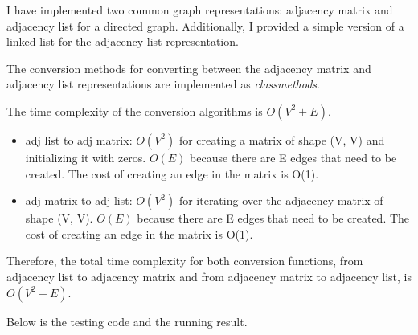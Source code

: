 \documentclass[10pt]{article}
\begin{document}
I have implemented two common graph representations: adjacency matrix and adjacency list for a directed graph. Additionally, I provided a simple version of a linked list for the adjacency list representation.

The conversion methods for converting between the adjacency matrix and adjacency list representations are implemented as \textit{classmethods}.

The time complexity of the conversion algorithms is $O(V^2 + E)$.

\begin{itemize}
  \item {adj list to adj matrix:
        $O(V^2)$ for creating a matrix of shape (V, V) and initializing it with zeros.
        $O(E)$ because there are E edges that need to be created. The cost of creating an edge in the matrix is O(1).
        }
  \item {adj matrix to adj list:
        $O(V^2)$ for iterating over the adjacency matrix of shape (V, V).
        $O(E)$ because there are E edges that need to be created. The cost of creating an edge in the matrix is O(1).
        }
\end{itemize}

Therefore, the total time complexity for both conversion functions, from adjacency list to adjacency matrix and from adjacency matrix to adjacency list, is $O(V^2 + E)$.

\bigbreak

Below is the testing code and the running result.
\end{document}
